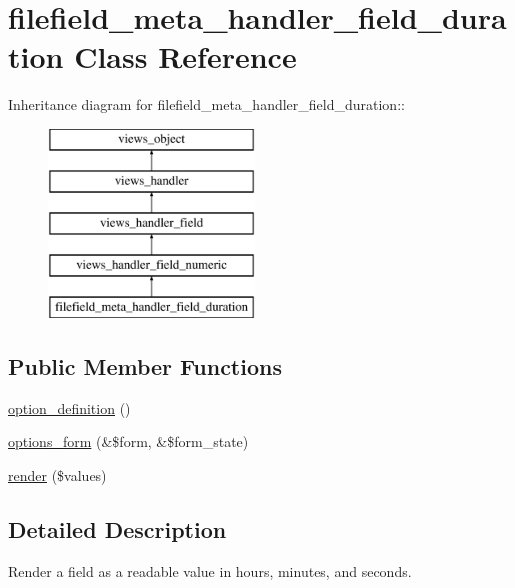 \hypertarget{classfilefield__meta__handler__field__duration}{
\section{filefield\_\-meta\_\-handler\_\-field\_\-duration Class Reference}
\label{classfilefield__meta__handler__field__duration}
}
Inheritance diagram for filefield\_\-meta\_\-handler\_\-field\_\-duration::\begin{figure}[H]
\begin{center}
\leavevmode
\includegraphics[height=5cm]{classfilefield__meta__handler__field__duration}
\end{center}
\end{figure}
\subsection*{Public Member Functions}
\begin{CompactItemize}
\item 
\hyperlink{classfilefield__meta__handler__field__duration_3bf4ecb0dbaa680516e6e27306771dd4}{option\_\-definition} ()
\item 
\hyperlink{classfilefield__meta__handler__field__duration_4c26d6d5b7dad8dce469f82d9bc9c70c}{options\_\-form} (\&\$form, \&\$form\_\-state)
\item 
\hyperlink{classfilefield__meta__handler__field__duration_f511f413dd52df372f7dc396efcc08f2}{render} (\$values)
\end{CompactItemize}


\subsection{Detailed Description}
Render a field as a readable value in hours, minutes, and seconds. 

